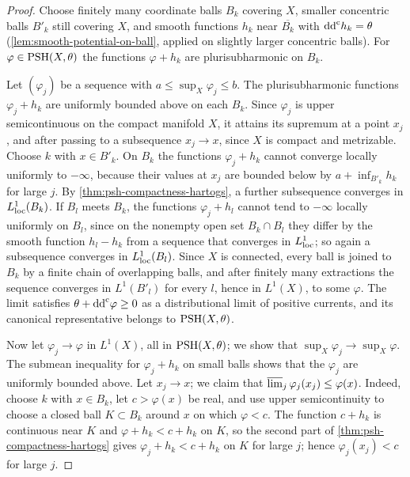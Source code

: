 \begin{proof}
Choose finitely many coordinate balls $B_k$ covering $X$, smaller concentric balls $B'_k$ still covering $X$, and smooth functions $h_k$ near $\overline{B_k}$ with $\mathrm{dd}^{\mathrm{c}} h_k=\theta$ (\cref{lem:smooth-potential-on-ball}, applied on slightly larger concentric balls). For $\varphi\in\mathrm{PSH}(X,\theta)$ the functions $\varphi+h_k$ are plurisubharmonic on $B_k$.

Let $(\varphi_j)$ be a sequence with $a\leq\sup_X\varphi_j\leq b$. The plurisubharmonic functions $\varphi_j+h_k$ are uniformly bounded above on each $B_k$. Since $\varphi_j$ is upper semicontinuous on the compact manifold $X$, it attains its supremum at a point $x_j$, and after passing to a subsequence $x_j\to x$, since $X$ is compact and metrizable. Choose $k$ with $x\in B'_k$. On $B_k$ the functions $\varphi_j+h_k$ cannot converge locally uniformly to $-\infty$, because their values at $x_j$ are bounded below by $a+\inf_{B'_k}h_k$ for large $j$. By \cref{thm:psh-compactness-hartogs}, a further subsequence converges in $L^1_{\mathrm{loc}}(B_k)$. If $B_l$ meets $B_k$, the functions $\varphi_j+h_l$ cannot tend to $-\infty$ locally uniformly on $B_l$, since on the nonempty open set $B_k\cap B_l$ they differ by the smooth function $h_l-h_k$ from a sequence that converges in $L^1_{\mathrm{loc}}$; so again a subsequence converges in $L^1_{\mathrm{loc}}(B_l)$. Since $X$ is connected, every ball is joined to $B_k$ by a finite chain of overlapping balls, and after finitely many extractions the sequence converges in $L^1(B'_l)$ for every $l$, hence in $L^1(X)$, to some $\varphi$. The limit satisfies $\theta+\mathrm{dd}^{\mathrm{c}}\varphi\geq0$ as a distributional limit of positive currents, and its canonical representative belongs to $\mathrm{PSH}(X,\theta)$.

Now let $\varphi_j\to\varphi$ in $L^1(X)$, all in $\mathrm{PSH}(X,\theta)$; we show that $\sup_X\varphi_j\to\sup_X\varphi$. The submean inequality for $\varphi_j+h_k$ on small balls shows that the $\varphi_j$ are uniformly bounded above. Let $x_j\to x$; we claim that $\varlimsup_j\varphi_j(x_j)\leq\varphi(x)$. Indeed, choose $k$ with $x\in B_k$, let $c>\varphi(x)$ be real, and use upper semicontinuity to choose a closed ball $K\subset B_k$ around $x$ on which $\varphi<c$. The function $c+h_k$ is continuous near $K$ and $\varphi+h_k<c+h_k$ on $K$, so the second part of \cref{thm:psh-compactness-hartogs} gives $\varphi_j+h_k<c+h_k$ on $K$ for large $j$; hence $\varphi_j(x_j)<c$ for large $j$.


\end{proof}
